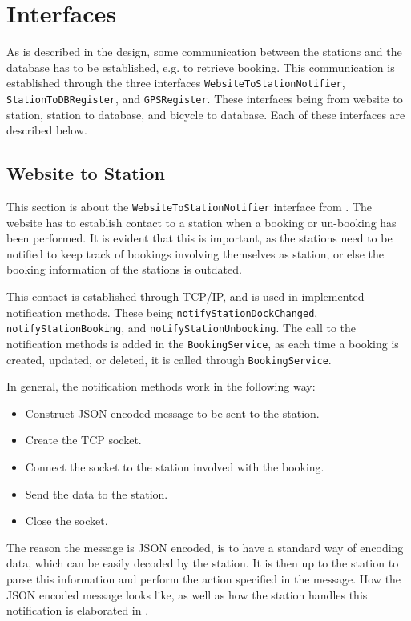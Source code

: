 \section{Interfaces}\label{sec:interfaces}
As is described in the design, some communication between the stations and the database has to be established, e.g. to retrieve booking.
This communication is established through the three interfaces \texttt{WebsiteToStationNotifier}, \texttt{StationToDBRegister}, and \texttt{GPSRegister}.
These interfaces being from website to station, station to database, and bicycle to database.
Each of these interfaces are described below.

\subsection{Website to Station}\label{sec:webToStationI}
This section is about the \texttt{WebsiteToStationNotifier} interface from .
The website has to establish contact to a station when a booking or un-booking has been performed.
It is evident that this is important, as the stations need to be notified to keep track of bookings involving themselves as station, or else the booking information of the stations is outdated.

This contact is established through TCP/IP, and is used in implemented notification methods.
These being \texttt{notifyStationDockChanged}, \texttt{notifyStationBooking}, and \texttt{notify\-Station\-Unbooking}.
The call to the notification methods is added in the \texttt{BookingService}, as each time a booking is created, updated, or deleted, it is called through \texttt{BookingService}.

In general, the notification methods work in the following way:
\begin{itemize}
	\item Construct JSON encoded message to be sent to the station.
	\item Create the TCP socket.
	\item Connect the socket to the station involved with the booking.
	\item Send the data to the station.
	\item Close the socket.
\end{itemize}

The reason the message is JSON encoded, is to have a standard way of encoding data, which can be easily decoded by the station.
It is then up to the station to parse this information and perform the action specified in the message.
How the JSON encoded message looks like, as well as how the station handles this notification is elaborated in .

